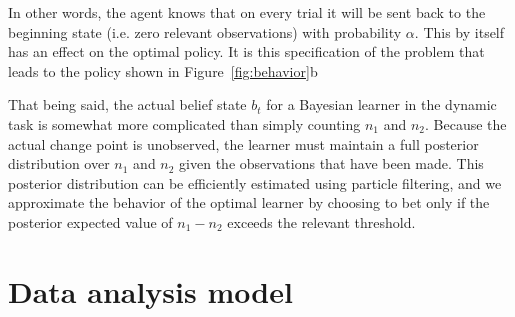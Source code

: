 \documentclass[authoryear]{elsarticle}
\begin{document}
In other words, the agent knows that on every trial it will be sent back to the beginning state (i.e. zero relevant observations) with probability $\alpha$. This by itself has an effect on the optimal policy. It is this specification of the problem that leads to the policy shown in Figure~\ref{fig:behavior}b

That being said, the actual belief state $b_t$ for a Bayesian learner in the dynamic task is somewhat more complicated than simply counting $n_1$ and $n_2$. Because the actual change point is unobserved, the learner must maintain a full posterior distribution over $n_1$ and $n_2$ given the observations that have been made. This posterior distribution can be efficiently estimated using particle filtering, and we approximate the behavior of the optimal learner by choosing to bet only if the posterior expected value of $n_1 - n_2$ exceeds the relevant threshold.

\section{Data analysis model}
\end{document}
